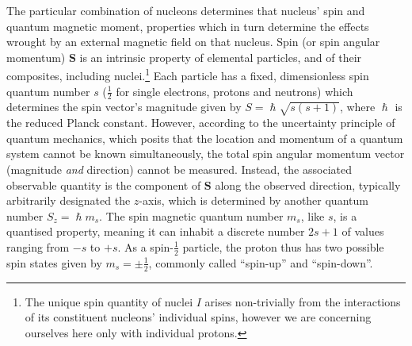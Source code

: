 The particular combination of nucleons determines that nucleus' spin and quantum magnetic moment, properties which in turn determine the effects wrought by an external magnetic field on that nucleus.
Spin (or spin angular momentum) $\mathbf{S}$ is an intrinsic property of elemental particles, and of their composites, including nuclei\autocite{Eisberg1961}.\footnote[2]{The unique spin quantity of nuclei $I$ arises non-trivially from the interactions of its constituent nucleons' individual spins, however we are concerning ourselves here only with individual protons.}
Each particle has a fixed, dimensionless spin quantum number $s$ ($\frac{1}{2}$ for single electrons, protons and neutrons) which determines the spin vector's magnitude given by $S = \hslash \sqrt{s(s+1)}$, where $\hslash$ is the reduced Planck constant.
However, according to the uncertainty principle of quantum mechanics, which posits that the location and momentum of a quantum system cannot be known simultaneously, the total spin angular momentum vector (magnitude \textit{and} direction) cannot be measured.
Instead, the associated observable quantity is the component of $\mathbf{S}$ along the observed direction, typically arbitrarily designated the $z$-axis, which is determined by another quantum number $S_z = \hslash m_s$.
The spin magnetic quantum number $m_s$, like $s$, is a quantised property, meaning it can inhabit a discrete number $2s+1$ of values ranging from $-s$ to $+s$.
As a spin-$\frac{1}{2}$ particle, the proton thus has two possible spin states given by $m_s = \pm \frac{1}{2}$, commonly called ``spin-up'' and ``spin-down''.

